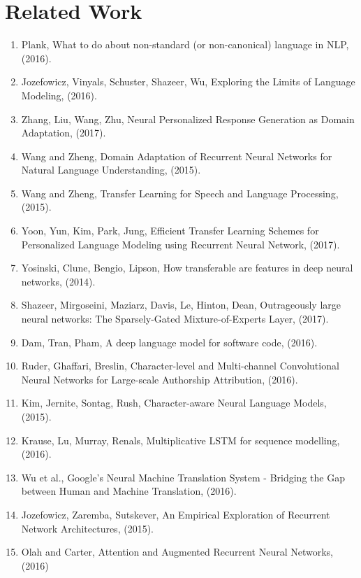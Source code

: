 \documentclass[12pt,letterpaper]{article}
\theoremstyle{remark}
\theoremstyle{plain}
\begin{document}








\section{Related Work}

\begin{enumerate}
\item Plank, What to do about non-standard (or non-canonical) language in NLP, (2016).
\item Jozefowicz, Vinyals, Schuster, Shazeer, Wu, Exploring the Limits of Language Modeling, (2016).
\item Zhang, Liu, Wang, Zhu, Neural Personalized Response Generation as Domain Adaptation, (2017).
\item Wang and Zheng, Domain Adaptation of Recurrent Neural Networks for Natural Language Understanding, (2015).
\item Wang and Zheng, Transfer Learning for Speech and Language Processing, (2015).
\item Yoon, Yun, Kim, Park, Jung, Efficient Transfer Learning Schemes for Personalized Language Modeling using Recurrent Neural Network, (2017).
\item Yosinski, Clune, Bengio, Lipson, How transferable are features in deep neural networks, (2014).
\item Shazeer, Mirgoseini, Maziarz, Davis, Le, Hinton, Dean, Outrageously large neural networks: The Sparsely-Gated Mixture-of-Experts Layer, (2017).
\item Dam, Tran, Pham, A deep language model for software code, (2016).
\item Ruder, Ghaffari, Breslin, Character-level and Multi-channel Convolutional Neural Networks for Large-scale Authorship Attribution, (2016).
\item Kim, Jernite, Sontag, Rush, Character-aware Neural Language Models, (2015).
\item Krause, Lu, Murray, Renals, Multiplicative LSTM for sequence modelling, (2016).
\item Wu et al., Google's Neural Machine Translation System - Bridging the Gap between Human and Machine Translation, (2016). \label{Wu2016}
\item Jozefowicz, Zaremba, Sutskever, An Empirical Exploration of Recurrent Network Architectures, (2015). \label{Jozefowicz2015}
\item Olah and Carter, Attention and Augmented Recurrent Neural Networks, (2016)
\end{enumerate}
\end{document}
